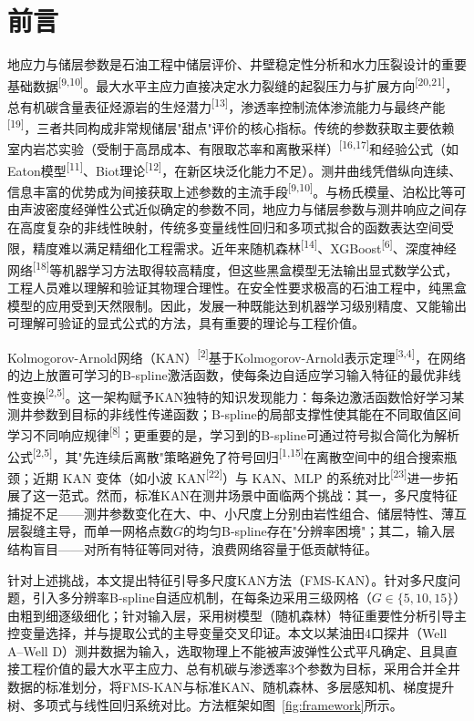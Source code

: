 \documentclass[final,3p,times,twocolumn]{elsarticle}
\begin{document}
\section{前言}

地应力与储层参数是石油工程中储层评价、井壁稳定性分析和水力压裂设计的重要基础数据\textsuperscript{[9,10]}。最大水平主应力直接决定水力裂缝的起裂压力与扩展方向\textsuperscript{[20,21]}，总有机碳含量表征烃源岩的生烃潜力\textsuperscript{[13]}，渗透率控制流体渗流能力与最终产能\textsuperscript{[19]}，三者共同构成非常规储层"甜点"评价的核心指标。传统的参数获取主要依赖室内岩芯实验（受制于高昂成本、有限取芯率和离散采样）\textsuperscript{[16,17]}和经验公式（如Eaton模型\textsuperscript{[11]}、Biot理论\textsuperscript{[12]}，在新区块泛化能力不足）。测井曲线凭借纵向连续、信息丰富的优势成为间接获取上述参数的主流手段\textsuperscript{[9,10]}。与杨氏模量、泊松比等可由声波密度经弹性公式近似确定的参数不同，地应力与储层参数与测井响应之间存在高度复杂的非线性映射，传统多变量线性回归和多项式拟合的函数表达空间受限，精度难以满足精细化工程需求。近年来随机森林\textsuperscript{[14]}、XGBoost\textsuperscript{[6]}、深度神经网络\textsuperscript{[18]}等机器学习方法取得较高精度，但这些黑盒模型无法输出显式数学公式，工程人员难以理解和验证其物理合理性。在安全性要求极高的石油工程中，纯黑盒模型的应用受到天然限制。因此，发展一种既能达到机器学习级别精度、又能输出可理解可验证的显式公式的方法，具有重要的理论与工程价值。

Kolmogorov-Arnold网络（KAN）\textsuperscript{[2]}基于Kolmogorov-Arnold表示定理\textsuperscript{[3,4]}，在网络的边上放置可学习的B-spline激活函数，使每条边自适应学习输入特征的最优非线性变换\textsuperscript{[2,5]}。这一架构赋予KAN独特的知识发现能力：每条边激活函数恰好学习某测井参数到目标的非线性传递函数；B-spline的局部支撑性使其能在不同取值区间学习不同响应规律\textsuperscript{[8]}；更重要的是，学习到的B-spline可通过符号拟合简化为解析公式\textsuperscript{[2,5]}，其"先连续后离散"策略避免了符号回归\textsuperscript{[1,15]}在离散空间中的组合搜索瓶颈；近期 KAN 变体（如小波 KAN\textsuperscript{[22]}）与 KAN、MLP 的系统对比\textsuperscript{[23]}进一步拓展了这一范式。然而，标准KAN在测井场景中面临两个挑战：其一，多尺度特征捕捉不足——测井参数变化在大、中、小尺度上分别由岩性组合、储层特性、薄互层裂缝主导，而单一网格点数$G$的均匀B-spline存在"分辨率困境"；其二，输入层结构盲目——对所有特征等同对待，浪费网络容量于低贡献特征。

针对上述挑战，本文提出特征引导多尺度KAN方法（FMS-KAN）。针对多尺度问题，引入多分辨率B-spline自适应机制，在每条边采用三级网格（$G\in\{5,10,15\}$）由粗到细逐级细化；针对输入层，采用树模型（随机森林）特征重要性分析引导主控变量选择，并与提取公式的主导变量交叉印证。本文以某油田4口探井（Well A--Well D）测井数据为输入，选取物理上不能被声波弹性公式平凡确定、且具直接工程价值的最大水平主应力、总有机碳与渗透率3个参数为目标，采用合并全井数据的标准划分，将FMS-KAN与标准KAN、随机森林、多层感知机、梯度提升树、多项式与线性回归系统对比。方法框架如图~\ref{fig:framework}所示。
\end{document}
